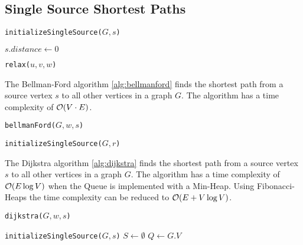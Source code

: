 \documentclass{article}
\begin{document}
\subsection{Single Source Shortest Paths}
\begin{algorithm}[H]
  \caption{\texttt{initializeSingleSource($G, s$)}}

  \BlankLine

  $s.distance \gets 0$
\end{algorithm}

\begin{algorithm}[H]
  \caption{\texttt{relax($u, v, w$)}}

  \BlankLine

\end{algorithm}

The Bellman-Ford algorithm \ref{alg:bellmanford} finds the shortest path from a source vertex $s$ to all other vertices in a graph $G$. The algorithm has a time complexity of $\mathcal{O}(V\cdot E)$.\par
\begin{algorithm}[H]
  \caption{\texttt{bellmanFord($G, w, s$)}}\label{alg:bellmanford}

  \BlankLine

  \texttt{initializeSingleSource($G, r$)}\;
\end{algorithm}

The Dijkstra algorithm \ref{alg:dijkstra} finds the shortest path from a source vertex $s$ to all other vertices in a graph $G$. The algorithm has a time complexity of $\mathcal{O}(E\log V)$ when the Queue is implemented with a Min-Heap. Using Fibonacci-Heaps the time complexity can be reduced to $\mathcal{O}(E+V\log V)$.\par
\begin{algorithm}[H]
  \caption{\texttt{dijkstra($G, w, s$)}}\label{alg:dijkstra}

  \BlankLine

  \texttt{initializeSingleSource($G, s$)}\;
  $S \gets \emptyset$
  $Q \gets G.V$

\end{algorithm}
\end{document}
